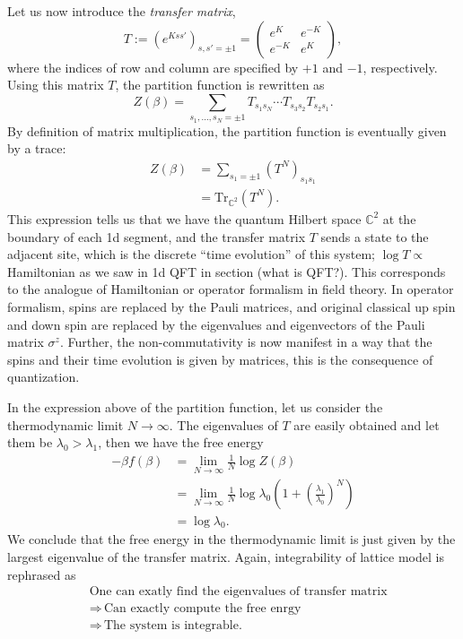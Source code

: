  Let us now introduce the \emph{transfer matrix},
\begin{equation}
  T  :=  \left(e^{Kss'}\right)_{s,s'=\pm1}  
    =
    \left(\begin{array}{ll}
  e^{K}  &  e^{-K}  \\
  e^{-K}  &  e^{K}
\end{array}\right),
\end{equation}
 where the indices of row and column are specified by $+1$ and $-1$,
respectively. Using this matrix $T$, the partition function is rewritten
as
\begin{equation}
  Z\left(\beta\right)
    =\sum_{s_{1},\ldots,s_{N}=\pm1}  T_{s_{1}s_{N}}  \cdots  T_{s_{3}s_{2}}T_{s_{2}s_{1}}.
\end{equation}
 By definition of matrix multiplication, the partition function is
eventually given by a trace: 
\begin{align}
  Z\left(\beta\right)  
  & =  \sum_{s_{1}=\pm1}\left(T^{N}\right)_{s_{1}s_{1}}  \nonumber \\
  & =  \mathrm{Tr}_{\mathbb{C}^{2}}\left(T^{N}\right).
\end{align}
 This expression tells us that we have the quantum Hilbert space $\mathbb{C}^{2}$
at the boundary of each 1d segment, and the transfer matrix $T$ sends
a state to the adjacent site, which is the discrete ``time evolution''
of this system; $\log T\propto$ Hamiltonian as we saw in 1d QFT in
section (what is QFT?). This corresponds to the analogue of Hamiltonian
or operator formalism in field theory. In operator formalism, spins
are replaced by the Pauli matrices, and original classical up spin
and down spin are replaced by the eigenvalues and eigenvectors of
the Pauli matrix $\sigma^{z}$. Further, the non-commutativity is
now manifest in a way that the spins and their time evolution is given
by matrices, this is the consequence of quantization. 

In the expression above of the partition function, let us consider
the thermodynamic limit $N\rightarrow\infty$. The eigenvalues of
$T$ are easily obtained and let them be $\lambda_{0}>\lambda_{1}$,
then we have the free energy
\begin{align}
-\beta f\left(\beta\right)  
  & =  \lim_{N\rightarrow\infty}\frac{1}{N}\log Z\left(\beta\right)\nonumber \\
  & =  \lim_{N\rightarrow\infty}\frac{1}{N}\log\lambda_{0}\left(1+\left(\frac{\lambda_{1}}{\lambda_{0}}\right)^{N}\right)\nonumber \\
  & =  \log\lambda_{0}.
\end{align}
 We conclude that the free energy in the thermodynamic limit is just
given by the largest eigenvalue of the transfer matrix. Again, integrability
of lattice model is rephrased as 
\begin{align*}
 &  \textrm{One can exatly find the eigenvalues of transfer matrix}\\
 &  \Rightarrow  \,  \textrm{Can exactly compute the free enrgy}\\
 &  \Rightarrow  \,  \textrm{The system is integrable. }
\end{align*}


